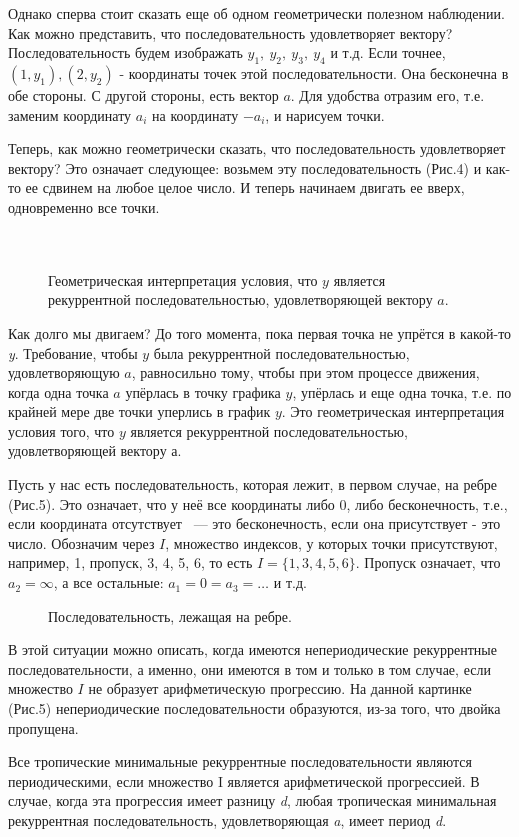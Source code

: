 \documentclass[russian]{lecture-notes}
\begin{document}
Однако сперва стоит сказать еще об одном геометрически полезном наблюдении. Как можно представить, что последовательность удовлетворяет вектору? Последовательность будем изображать $y_1,\: y_2,\: y_3,\: y_4$ и т.д. Если точнее, $(1,y_1),(2,y_2)$ - координаты точек этой последовательности. Она бесконечна в обе стороны. С другой стороны, есть вектор $a$. Для удобства отразим его, т.е. заменим координату $a_i$ на координату $-a_i$, и нарисуем точки.

Теперь, как можно геометрически сказать, что последовательность удовлетворяет вектору?  Это означает следующее: возьмем эту последовательность (Рис.4) и как-то ее сдвинем на любое целое число. И теперь начинаем двигать ее вверх, одновременно все точки.\\\\\\

\begin{figure}[h!]
\caption{Геометрическая интерпретация условия, что $y$ является рекуррентной последовательностью, удовлетворяющей вектору $a$.}
\end{figure}

Как долго мы двигаем? До того момента, пока первая точка не упрётся в какой-то {\itshape y}.
Требование, чтобы $y$ была рекуррентной последовательностью, удовлетворяющую $a$, равносильно тому, чтобы при этом процессе движения, когда одна точка $a$ упёрлась в точку графика $y$, упёрлась и еще одна точка, т.е. по крайней мере две точки уперлись в график $y$. Это геометрическая интерпретация условия того, что $y$ является рекуррентной последовательностью, удовлетворяющей вектору $а$.

Пусть у нас есть последовательность, которая лежит, в первом случае, на ребре (Рис.5). Это означает, что у неё все координаты либо 0, либо бесконечность, т.е., если координата отсутствует ~--- это бесконечность, если она присутствует - это число. Обозначим через $I$, множество индексов, у которых точки присутствуют, например, 1, пропуск, 3, 4, 5, 6, то есть $I=\{1,3,4,5,6\}$. Пропуск означает, что $a_2=\infty$, а все остальные: $a_1=0=a_3=\ldots$ и т.д.


\begin{figure}[h!]
\caption{Последовательность, лежащая на ребре.}
\end{figure}

В этой ситуации можно описать, когда имеются непериодические рекуррентные
последовательности, а именно, они имеются в том и только в том случае, если множество $I$ не образует арифметическую прогрессию. На данной картинке (Рис.5) непериодические последовательности образуются, из-за того, что двойка пропущена.\\
\begin{Theorem}
	Все тропические минимальные рекуррентные последовательности являются периодическими, если множество I является арифметической прогрессией. В случае, когда эта прогрессия имеет разницу {\itshape d}, любая тропическая минимальная рекуррентная последовательность, удовлетворяющая {\itshape a}, имеет период {\itshape d}.
\end{Theorem}
\end{document}
